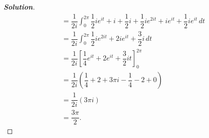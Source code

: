 \documentclass[11pt]{article}
\newenvironment{problem}[2][Problem\!]{\begin{trivlist}
\item[\hskip \labelsep {\bfseries #1}\hskip \labelsep {\bfseries #2}]}{\end{trivlist}}
\newenvironment{solution}{\begin{proof}[\textbf{\textit{Solution}}] }{\end{proof}}
\newcommand{\lrp}[1]{\left(#1\right)}
\newcommand{\lrb}[1]{\left[#1\right]}
\begin{document}
\begin{problem}{7.2}
\begin{itemize}[itemsep=3em]
\begin{solution}
\begin{align*}
    &= \dfrac{1}{2i}\int_0^{2\pi} \dfrac{1}{2}ie^{it} + i + \dfrac{1}{2}i + \dfrac{1}{2}i e^{2 i t} + ie^{i t} + \dfrac{1}{2}i e^{i t} \, d t \\
    &= \dfrac{1}{2i}\int_0^{2\pi} \dfrac{1}{2}ie^{2it} + 2ie^{it} + \dfrac{3}{2}i \, d t \\
    &= \dfrac{1}{2i}\lrb{\dfrac{1}{4}e^{it} + 2e^{it} + \dfrac{3}{2}it }_0^{2\pi} \\
    &= \dfrac{1}{2i}\lrp{\dfrac{1}{4} + 2 + 3\pi i - \dfrac{1}{4} - 2 + 0 } \\
    &= \dfrac{1}{2i}(3\pi i) \\
    &= \dfrac{3\pi}{2}.
  \end{align*}

\end{solution}

\end{itemize}
\end{problem}

\newpage  %
\end{document}
